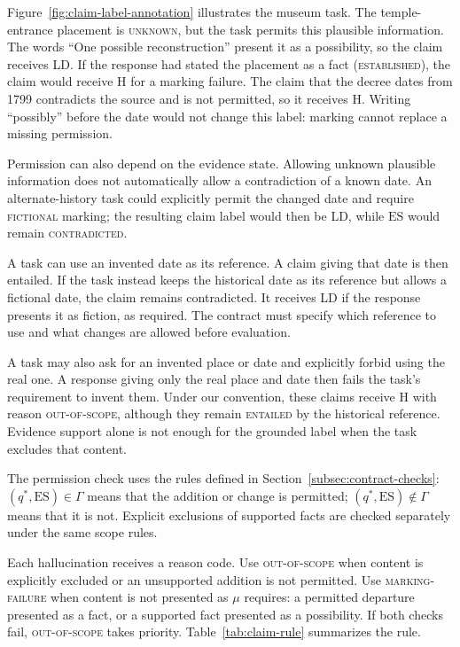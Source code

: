 \documentclass{clv2025}
\newcommand{\LD}{\textsc{LD}}
\newcommand{\Hall}{\textsc{H}}
\begin{document}
Figure~\ref{fig:claim-label-annotation} illustrates the museum task.
The temple-entrance placement is \textsc{unknown}, but the task permits this
plausible information. The words ``One possible reconstruction'' present it
as a possibility, so the claim receives \LD{}. If the response had stated
the placement as a fact (\textsc{established}), the claim would receive
\Hall{} for a marking failure.
The claim that the decree dates from 1799 contradicts the source and is not
permitted, so it receives \Hall{}. Writing ``possibly'' before the date would
not change this label: marking cannot replace a missing permission.

Permission can also depend on the evidence state. Allowing unknown
plausible information does not automatically allow a contradiction of a known date.
An alternate-history task could explicitly permit the changed date and
require \textsc{fictional} marking; the resulting claim label would then be \LD{}, while $\mathrm{ES}$ would
remain \textsc{contradicted}.

A task can use an invented date as its reference. A claim giving that date
is then entailed. If the task instead keeps the historical date as its
reference but allows a fictional date, the claim remains contradicted.
It receives \LD{} if the response presents it as fiction, as required.
The contract must specify which reference to use and what changes are
allowed before evaluation.

A task may also ask for an invented place or date and explicitly forbid
using the real one. A response giving only the real place and date then
fails the task's requirement to invent them. Under our convention, these
claims receive \Hall{} with reason \textsc{out-of-scope}, although they
remain \textsc{entailed} by the historical reference. Evidence support
alone is not enough for the grounded label when the task excludes that
content.

The permission check uses the rules defined in Section~\ref{subsec:contract-checks}:
$(q^*,\mathrm{ES})\in\Gamma$ means that the addition or change is permitted;
$(q^*,\mathrm{ES})\notin\Gamma$ means that it is not. Explicit exclusions
of supported facts are checked separately under the same scope rules.

Each hallucination receives a reason code. Use \textsc{out-of-scope} when
content is explicitly excluded or an unsupported addition is not permitted. Use
\textsc{marking-failure} when content is not presented as $\mu$ requires:
a permitted departure presented as a fact, or a supported fact presented as
a possibility. If both checks fail, \textsc{out-of-scope} takes priority.
Table~\ref{tab:claim-rule} summarizes the rule.
\end{document}

